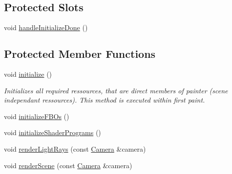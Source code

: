 \subsection*{Protected Slots}
\begin{DoxyCompactItemize}
\item 
void \hyperlink{class_painter_ab5dbc13d3e46ee83c4f819a5ae74206e}{handle\+Initialize\+Done} ()
\end{DoxyCompactItemize}
\subsection*{Protected Member Functions}
\begin{DoxyCompactItemize}
\item 
void \hyperlink{class_painter_a12f9623c2acf87eced6e141e7638804e}{initialize} ()
\begin{DoxyCompactList}\small\item\em Initializes all required ressources, that are direct members of painter (scene independant ressources). This method is executed within first paint. \end{DoxyCompactList}\item 
void \hyperlink{class_painter_ad7db952528a1d7745dbf083ee1431f50}{initialize\+F\+B\+Os} ()
\item 
void \hyperlink{class_painter_a4fee3b94c00da17f851b52cc8d60ff72}{initialize\+Shader\+Programs} ()
\item 
void \hyperlink{class_painter_a5fee5d930d347b38fe1aa565e3264d3c}{render\+Light\+Rays} (const \hyperlink{class_camera}{Camera} \&camera)
\item 
void \hyperlink{class_painter_a8cbffb0c2d28dd1558716136c99a079f}{render\+Scene} (const \hyperlink{class_camera}{Camera} \&camera)
\end{DoxyCompactItemize}
